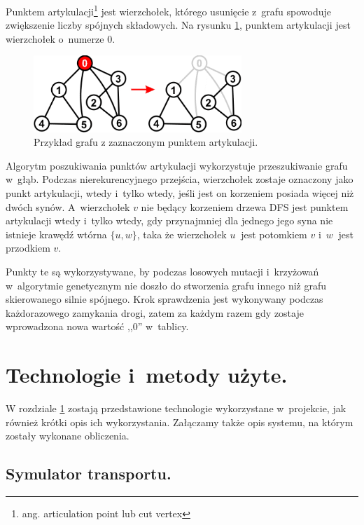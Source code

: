 \documentclass[twoside,12pt]{report}
\let\oldsection\chapter
\def\chapter{\cleardoublepage\oldsection}
\begin{document}
Punktem artykulacji\footnote{ang. articulation point lub cut vertex} jest wierzchołek, którego usunięcie z~grafu spowoduje zwiększenie liczby spójnych składowych. Na rysunku \ref{artykulacja}, punktem artykulacji jest wierzchołek o~numerze $0$.

\begin{figure}[ht]
\begin{center}
\includegraphics[width=0.7\textwidth]{img/articulation}
\caption{Przykład grafu z zaznaczonym punktem artykulacji.}
\label{artykulacja}
\end{center}
\end{figure}

Algorytm poszukiwania punktów artykulacji wykorzystuje przeszukiwanie grafu w~głąb. Podczas nierekurencyjnego przejścia, wierzchołek zostaje oznaczony jako punkt artykulacji, wtedy i~tylko wtedy, jeśli jest on korzeniem posiada więcej niż dwóch synów. A~wierzchołek $ v $ nie będący korzeniem drzewa DFS jest punktem artykulacji wtedy i~tylko wtedy, gdy przynajmniej dla jednego jego syna nie istnieje krawędź wtórna $ \{u,w\} $, taka że wierzchołek $ u~$ jest potomkiem $ v $ i~$ w~$ jest przodkiem $ v $.

Punkty te są wykorzystywane, by podczas losowych mutacji i~krzyżowań w~algorytmie genetycznym nie doszło do stworzenia grafu innego niż grafu skierowanego silnie spójnego. Krok sprawdzenia jest wykonywany podczas każdorazowego zamykania drogi, zatem za każdym razem gdy zostaje wprowadzona nowa wartość ,,$0$'' w~tablicy.

\chapter{Technologie i~metody użyte.}\label{rozdz.technologie} 

W rozdziale \ref{rozdz.technologie} zostają przedstawione technologie wykorzystane w~projekcie, jak również krótki opis ich wykorzystania. Załączamy także opis systemu, na którym zostały wykonane obliczenia.

\section{Symulator transportu.}
\end{document}
